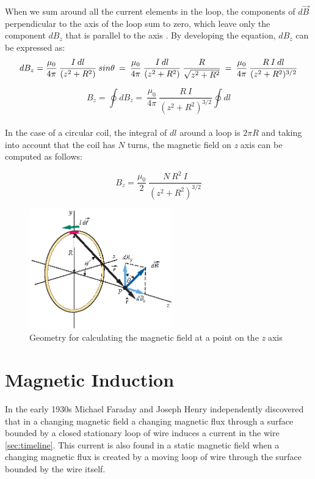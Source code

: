 When we sum around all the current elements in the loop, the components of $d\vec{B}$ perpendicular to the axis of the loop sum to zero, which leave only the component $dB_z$ that is parallel to the axis \cite{tipler}. By developing the equation, $dB_z$ can be expressed as:
\\
\begin{equation*}
dB_z=\frac{\mu_0}{4\pi}\:\frac{I\:dl}{(z^2+R^2)}\:sin\theta\:=\:\frac{\mu_0}{4\pi}\:\frac{I\:dl}{(z^2+R^2)}\:\frac{R}{\sqrt{z^2+R^2}}\:=\:\frac{\mu_0}{4\pi}\:\frac{R\:I\:dl}{(z^2+R^2)^{3/2}} \\[10pt]
\end{equation*}

\begin{equation*}
B_z=\oint dB_z=\:\frac{\mu_0}{4\pi}\:\frac{R\:I}{(z^2+R^2)^{3/2}}\oint dl
\end{equation*} \\

In the case of a circular coil, the integral of $dl$ around a loop is $2\pi{R}$ and taking into account that the coil has $N$ turns, the magnetic field on \textit{z} axis can be computed as follows:

\begin{equation}
B_z=\frac{\mu_0}{2}\:\frac{N\:R^2\:I}{(z^2+R^2)^{3/2}}
\label{eq:magneticField}
\end{equation}

\begin{figure}[htb]
\begin{center}
	\includegraphics[width=0.55\textwidth]{./images/tip}
\caption{Geometry for calculating the magnetic field at a point on the \textit{z} axis}
\label{F:magneticField}
\end{center}
\end{figure}

	\section{Magnetic Induction}
In the early 1930s Michael Faraday and Joseph Henry independently discovered that in a changing magnetic field a changing magnetic flux through a surface bounded by a closed stationary loop of wire induces a current in the wire \ref{sec:timeline}. This current is also found in a static magnetic field when a changing magnetic flux is created by a moving loop of wire through the surface bounded by the wire itself. 


